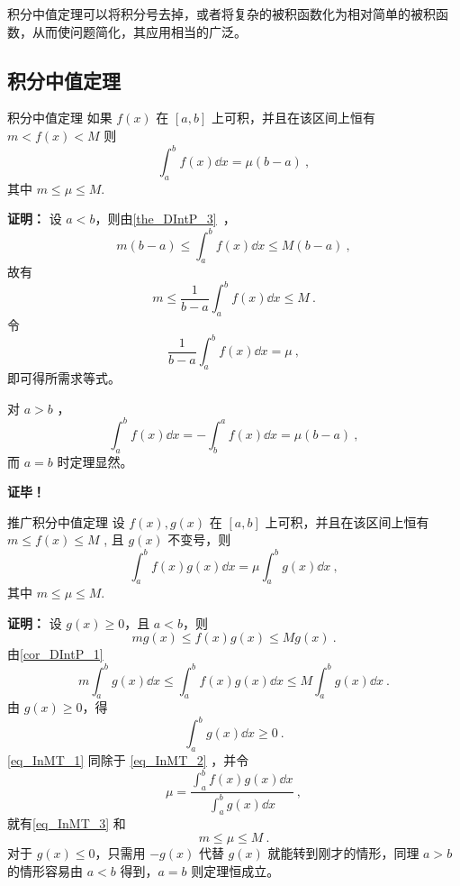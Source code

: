 
积分中值定理可以将积分号去掉，或者将复杂的被积函数化为相对简单的被积函数，从而使问题简化，其应用相当的广泛。

\subsection{积分中值定理}
\begin{theorem}{积分中值定理}
如果 $f(x)$ 在 $[a,b]$ 上可积，并且在该区间上恒有$m<f(x)<M$
则
\begin{equation}
\int_a^b f(x)\dd x=\mu(b-a)~,
\end{equation}
其中 $m\leq\mu\leq M.$
\end{theorem}

\textbf{证明：}
设 $a<b$，则由\autoref{the_DIntP_3}~，
\begin{equation}
m(b-a)\leq\int_a^b f(x)\dd x\leq M(b-a)~,
\end{equation}
故有
\begin{equation}
m\leq\frac{1}{b-a}\int_a^b f(x)\dd x\leq M~.
\end{equation}
令
\begin{equation}
\frac{1}{b-a}\int_a^b f(x)\dd x=\mu~,
\end{equation}
即可得所需求等式。

对 $a>b$ ，
\begin{equation}
\int_a^b f(x)\dd x=-\int_b^a f(x)\dd x=\mu(b-a)~,
\end{equation}
而 $a=b$ 时定理显然。 

\textbf{证毕！}

\begin{theorem}{推广积分中值定理}\label{the_InMT_1}
设 $f(x),g(x)$ 在 $[a,b]$ 上可积，并且在该区间上恒有$m\leq f(x)\leq M$
, 且 $g(x)$ 不变号，则
\begin{equation}\label{eq_InMT_3}
\int_a^b f(x)g(x)\dd x=\mu\int_a^b g(x)\dd x~,
\end{equation}
其中 $m\leq\mu\leq M.$
\end{theorem}
\textbf{证明：}
设 $g(x)\geq 0$，且 $a<b$，则
\begin{equation}
mg(x)\leq f(x)g(x)\leq Mg(x)~.
\end{equation}
由\autoref{cor_DIntP_1}~
\begin{equation}\label{eq_InMT_1}
m\int_a^b g(x)\dd x\leq\int_a^b f(x)g(x)\dd x\leq M\int_a^b g(x)\dd x~.
\end{equation}
由 $g(x)\geq0$，得
\begin{equation}\label{eq_InMT_2}
\int_a^b g(x)\dd x\geq0~.
\end{equation}
\autoref{eq_InMT_1} 同除于 \autoref{eq_InMT_2} ，并令
\begin{equation}
\mu=\frac{\int_a^b f(x)g(x)\dd x}{\int_a^b g(x)\dd x}~,
\end{equation}
就有\autoref{eq_InMT_3} 和
\begin{equation}
m\leq\mu\leq M~.
\end{equation}
对于 $g(x)\leq0$，只需用 $-g(x)$ 代替 $g(x)$ 就能转到刚才的情形，同理 $a>b$ 的情形容易由 $a<b$ 得到，$a=b$ 则定理恒成立。

